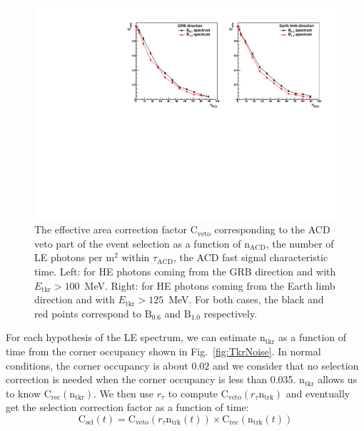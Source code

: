 \documentclass[preprint]{aastex631}
\begin{document}
\begin{figure}[t]
    \centering
    \includegraphics[width=0.9\linewidth]{paper_EfficiencyCorrection_veto.pdf}
    \caption{The effective area correction factor $\mathrm{C}_\mathrm{veto}$ corresponding to the ACD veto part of the event selection as a function of $\mathrm{n}_\mathrm{ACD}$, the number of LE photons per $\mathrm{m}^2$ within $\tau_\mathrm{ACD}$, the ACD fast signal characteristic time. Left: for HE photons coming from the GRB direction and with $E_\mathrm{tkr}>100$~MeV. Right: for HE photons coming from the Earth limb direction and with $E_\mathrm{tkr}>125$~MeV. For both cases, the black and red points correspond to $\mathrm{B}_{0.6}$ and $\mathrm{B}_{1.0}$ respectively.}
    \label{fig:EffCorVeto}
\end{figure}

For each hypothesis of the LE spectrum, we can estimate $\mathrm{n}_\mathrm{tkr}$ as a function of time from the corner occupancy shown in Fig.~\ref{fig:TkrNoise}. In normal conditions, the corner occupancy is about $0.02$ and we consider that no selection correction is needed when the corner occupancy is less than 0.035. $\mathrm{n}_\mathrm{tkr}$ allows us to know $\mathrm{C}_\mathrm{rec} (\mathrm{n}_\mathrm{tkr})$. We then use $r_\tau$ to compute $\mathrm{C}_\mathrm{veto} (r_\tau \mathrm{n}_\mathrm{trk})$ and eventually get the selection correction factor as a function of time:
\begin{equation} \label{eq:efficiency_correction2}
\mathrm{C}_\mathrm{sel} (t) = \mathrm{C}_\mathrm{veto} \left(r_\tau \mathrm{n}_\mathrm{trk}(t) \right) \times \mathrm{C}_\mathrm{rec} \left (\mathrm{n}_\mathrm{trk}(t) \right)
\end{equation}
\end{document}
